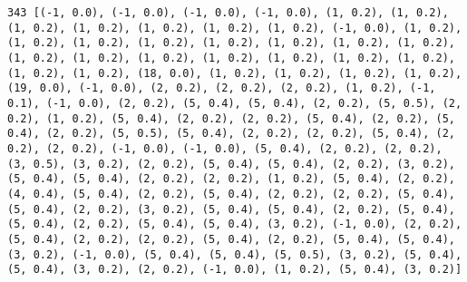 \documentclass[11pt]{article}
\begin{document}
\begin{Verbatim}[commandchars=\\\{\}]
343 [(-1, 0.0), (-1, 0.0), (-1, 0.0), (-1, 0.0), (1, 0.2), (1, 0.2), (1, 0.2), (1, 0.2), (1, 0.2), (1, 0.2), (1, 0.2), (-1, 0.0), (1, 0.2), (1, 0.2), (1, 0.2), (1, 0.2), (1, 0.2), (1, 0.2), (1, 0.2), (1, 0.2), (1, 0.2), (1, 0.2), (1, 0.2), (1, 0.2), (1, 0.2), (1, 0.2), (1, 0.2), (1, 0.2), (1, 0.2), (18, 0.0), (1, 0.2), (1, 0.2), (1, 0.2), (1, 0.2), (19, 0.0), (-1, 0.0), (2, 0.2), (2, 0.2), (2, 0.2), (1, 0.2), (-1, 0.1), (-1, 0.0), (2, 0.2), (5, 0.4), (5, 0.4), (2, 0.2), (5, 0.5), (2, 0.2), (1, 0.2), (5, 0.4), (2, 0.2), (2, 0.2), (5, 0.4), (2, 0.2), (5, 0.4), (2, 0.2), (5, 0.5), (5, 0.4), (2, 0.2), (2, 0.2), (5, 0.4), (2, 0.2), (2, 0.2), (-1, 0.0), (-1, 0.0), (5, 0.4), (2, 0.2), (2, 0.2), (3, 0.5), (3, 0.2), (2, 0.2), (5, 0.4), (5, 0.4), (2, 0.2), (3, 0.2), (5, 0.4), (5, 0.4), (2, 0.2), (2, 0.2), (1, 0.2), (5, 0.4), (2, 0.2), (4, 0.4), (5, 0.4), (2, 0.2), (5, 0.4), (2, 0.2), (2, 0.2), (5, 0.4), (5, 0.4), (2, 0.2), (3, 0.2), (5, 0.4), (5, 0.4), (2, 0.2), (5, 0.4), (5, 0.4), (2, 0.2), (5, 0.4), (5, 0.4), (3, 0.2), (-1, 0.0), (2, 0.2), (5, 0.4), (2, 0.2), (2, 0.2), (5, 0.4), (2, 0.2), (5, 0.4), (5, 0.4), (3, 0.2), (-1, 0.0), (5, 0.4), (5, 0.4), (5, 0.5), (3, 0.2), (5, 0.4), (5, 0.4), (3, 0.2), (2, 0.2), (-1, 0.0), (1, 0.2), (5, 0.4), (3, 0.2)]

\end{Verbatim}
\end{document}
